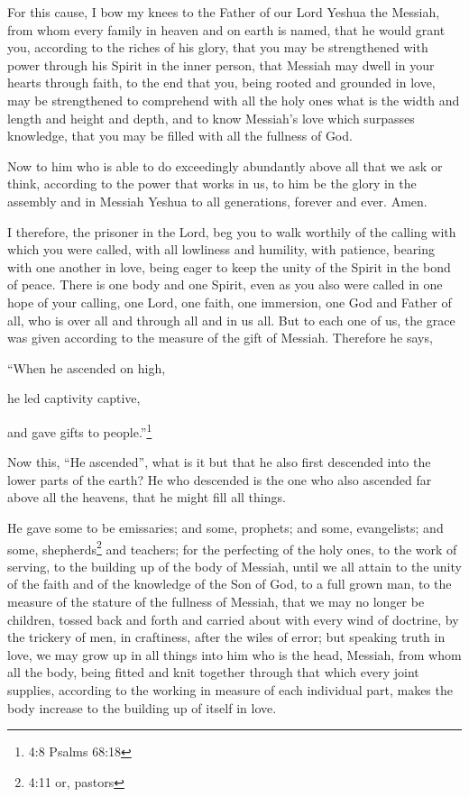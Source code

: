 \myverse{}For this cause, I bow my knees to the Father of our Lord Yeshua the Messiah,
\myverse{}from whom every family in heaven and on earth is named,
\myverse{}that he would grant you, according to the riches of his glory, that you may
be strengthened with power through his Spirit in the inner person,
\myverse{}that Messiah may dwell in your hearts through faith, to the end that you,
being rooted and grounded in love,
\myverse{}may be strengthened to comprehend with all the holy ones what is the width
and length and height and depth,
\myverse{}and to know Messiah’s love which surpasses knowledge, that you may be filled
with all the fullness of God.

\myverse{}Now to him who is able to do exceedingly abundantly above all
that we ask or think, according to the power that works in us,
\myverse{}to him be the glory in the assembly and in Messiah Yeshua to all generations,
forever and ever. Amen.


\mychapter{} \myverse*{}I therefore, the prisoner in the Lord, beg you to walk worthily
of the calling with which you were called,
\myverse{}with all lowliness and humility, with patience, bearing with one another in
love,
\myverse{}being eager to keep the unity of the Spirit in the bond of peace.
\myverse{}There is one body and one Spirit, even as you also were called in one hope of
your calling,
\myverse{}one Lord, one faith, one immersion,
\myverse{}one God and Father of all, who is over all and through all and in us all.
\myverse{}But to each one of us, the grace was given according to the measure of the gift
of Messiah.
\myverse{}Therefore he says,

“When he ascended on high,

he led captivity captive,

and gave gifts to people.”\footnote{4:8 Psalms 68:18}

\myverse{}Now this, “He ascended”, what is it but that he also first
descended into the lower parts of the earth?
\myverse{}He who descended is the one who also ascended far above all the heavens, that
he might fill all things.

\myverse{}He gave some to be emissaries; and some, prophets; and some,
evangelists; and some, shepherds\footnote{4:11 or, pastors} and teachers;
\myverse{}for the perfecting of the holy ones, to the work of serving, to the building
up of the body of Messiah,
\myverse{}until we all attain to the unity of the faith and of the knowledge of the
Son of God, to a full grown man, to the measure of the stature of the fullness of Messiah,
\myverse{}that we may no longer be children, tossed back and forth and carried about
with every wind of doctrine, by the trickery of men, in craftiness, after the wiles of error;
\myverse{}but speaking truth in love, we may grow up in all things into him who is the
head, Messiah,
\myverse{}from whom all the body, being fitted and knit together through that which
every joint supplies, according to the working in measure of each individual part, makes the body increase
to the building up of itself in love.

